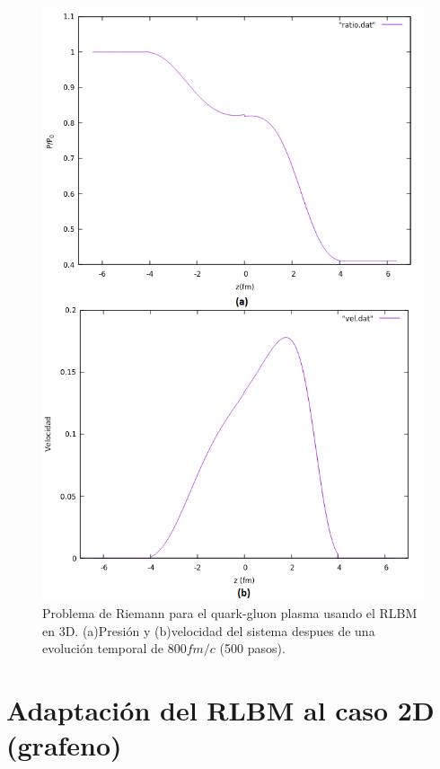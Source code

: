 \documentclass{article}
\begin{document}
\begin{figure}[th!]
   \includegraphics[width=0.89\columnwidth]{riemann.png}
   \caption{Problema de Riemann para el quark-gluon plasma usando el RLBM en 3D. (a)Presión y (b)velocidad del sistema despues de una evolución temporal de $800 fm/c$ (500 pasos).}
\end{figure}

\section{Adaptación del RLBM al caso 2D (grafeno)}
\end{document}
